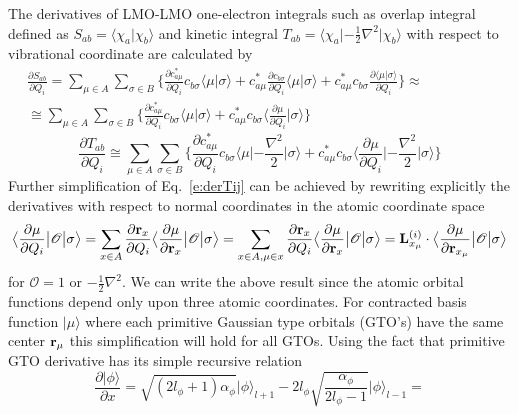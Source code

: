 \documentclass[a4paper,titlepage,twoside,fleqn,12pt]{book}
\newcommand{\ket}[1]{\ensuremath{\bigr\rvert {#1} \bigr\rangle}}
\newcommand{\braket}[2]{\ensuremath{\bigl\langle {#1} \bigl\lvert {#2} \bigr\rangle}}
\newcommand{\tbraket}[3]{\ensuremath{\bigl\langle {#1} \bigl\lvert {#2} \bigl\lvert {#3} \bigr\rangle}}
\newcommand{\fderiv}[2]{\ensuremath{
\frac{\partial #1}{\partial #2}}}
\begin{document}
\begin{refsection}
The derivatives of LMO-LMO one-electron integrals 
such as overlap integral defined as $S_{ab}=\langle \chi_a\vert\chi_b\rangle$ 
and kinetic integral 
$T_{ab}=\langle \chi_a\lvert-\frac{1}{2}\nabla^2\rvert\chi_b\rangle$
with respect to vibrational coordinate are calculated by
%
\begin{multline}\label{e:derSij}
\fderiv{S_{ab}}{Q_i} = 
\sum_{\mu \in A} \sum_{\sigma \in B} 
\Big\{
\fderiv{c_{a\mu}^*}{Q_i} c_{b\sigma} \braket{\mu}{\sigma} +
c_{a\mu}^* \fderiv{c_{b\sigma}}{Q_i} \braket{\mu}{\sigma} + 
c_{a\mu}^* c_{b\sigma}  \fderiv{\braket{\mu}{\sigma}}{Q_i}
\Big\}
\approx \\ \cong
\sum_{\mu \in A} \sum_{\sigma \in B} 
\Big\{
\fderiv{c_{a\mu}^*}{Q_i} c_{b\sigma} \braket{\mu}{\sigma} +
c_{a\mu}^* c_{b\sigma}   \braket{\fderiv{\mu}{Q_i}}{\sigma}
\Big\}
\quad\quad\quad\quad\quad\quad\quad\quad\quad\quad\quad\quad\quad
\end{multline}
%
\begin{equation}\label{e:derTij}
\fderiv{T_{ab}}{Q_i}  \cong
\sum_{\mu \in A} \sum_{\sigma \in B} 
\Big\{
\fderiv{c_{a\mu}^*}{Q_i} c_{b\sigma} \tbraket{\mu}{ -\frac{\nabla^2}{2} }{\sigma} +
c_{a\mu}^* c_{b\sigma}   \tbraket{\fderiv{\mu}{Q_i}}{ -\frac{\nabla^2}{2} }{\sigma}
\Big\}
\end{equation}
%
Further simplification of Eq.~\eqref{e:derTij} 
can be achieved by rewriting explicitly the derivatives 
with respect to normal coordinates in the atomic coordinate space 
%
\begin{equation}\label{e:derXij}
\tbraket{\fderiv{\mu}{Q_i}}{ \mathscr{O} }{\sigma} = 
\sum_{x \in A} \fderiv{{\bf r}_x}{Q_i} \tbraket{\fderiv{\mu}{{\bf r}_x}}{ \mathscr{O} }{\sigma} =
\sum_{x \in A, \mu \in x} \fderiv{{\bf r}_x}{Q_i} \tbraket{\fderiv{\mu}{{\bf r}_x}}{ \mathscr{O} }{\sigma} =
{\bf L}^{(i)}_{x_\mu} \cdot \tbraket{\fderiv{\mu}{{\bf r}_{x_\mu}}}{ \mathscr{O} }{\sigma}
\end{equation}
%
for $\mathscr{O}=1$ or $-\frac{1}{2}\nabla^2$.
We can write the above result since the atomic orbital functions depend only upon three atomic coordinates. For contracted 
basis function $\ket{\mu}$ where each primitive Gaussian type orbitals (GTO's) have the same center
${\bf r}_\mu$ this simplification will hold for all GTOs. Using the fact that primitive GTO derivative
has its simple recursive relation
%
\begin{equation}\label{orbder}
\fderiv{\ket{\phi}} {x} = 
\sqrt{\left( 2l_\phi + 1 \right)\alpha_\phi} \ket{\phi}_{l+1} -
2l_\phi \sqrt{\frac{\alpha_\phi}{2l_\phi-1}} \ket{\phi}_{l-1} =

\end{equation}
\end{refsection}
\end{document}
